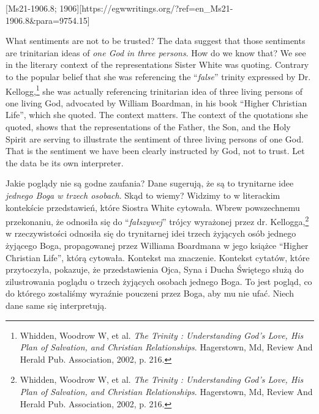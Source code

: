[Ms21-1906.8; 1906][https://egwwritings.org/?ref=en\_Ms21-1906.8&para=9754.15]


What sentiments are not to be trusted? The data suggest that those sentiments are trinitarian ideas of \textit{one God in three persons}. How do we know that? We see in the literary context of the representations Sister White was quoting. Contrary to the popular belief that she was referencing the “\textit{false}” trinity expressed by Dr. Kellogg,\footnote{Whidden, Woodrow W, et al. \textit{The Trinity : Understanding God’s Love, His Plan of Salvation, and Christian Relationships}. Hagerstown, Md, Review And Herald Pub. Association, 2002, p. 216.} she was actually referencing trinitarian idea of three living persons of one living God, advocated by William Boardman, in his book “Higher Christian Life”, which she quoted. The context matters. The context of the quotations she quoted, shows that the representations of the Father, the Son, and the Holy Spirit are serving to illustrate the sentiment of three living persons of one God. That is the sentiment we have been clearly instructed by God, not to trust. Let the data be its own interpreter.


Jakie poglądy nie są godne zaufania? Dane sugerują, że są to trynitarne idee \textit{jednego Boga w trzech osobach}. Skąd to wiemy? Widzimy to w literackim kontekście przedstawień, które Siostra White cytowała. Wbrew powszechnemu przekonaniu, że odnosiła się do “\textit{fałszywej}” trójcy wyrażonej przez dr. Kellogga,\footnote{Whidden, Woodrow W, et al. \textit{The Trinity : Understanding God's Love, His Plan of Salvation, and Christian Relationships}. Hagerstown, Md, Review And Herald Pub. Association, 2002, p. 216.} w rzeczywistości odnosiła się do trynitarnej idei trzech żyjących osób jednego żyjącego Boga, propagowanej przez Williama Boardmana w jego książce “Higher Christian Life”, którą cytowała. Kontekst ma znaczenie. Kontekst cytatów, które przytoczyła, pokazuje, że przedstawienia Ojca, Syna i Ducha Świętego służą do zilustrowania poglądu o trzech żyjących osobach jednego Boga. To jest pogląd, co do którego zostaliśmy wyraźnie pouczeni przez Boga, aby mu nie ufać. Niech dane same się interpretują.


